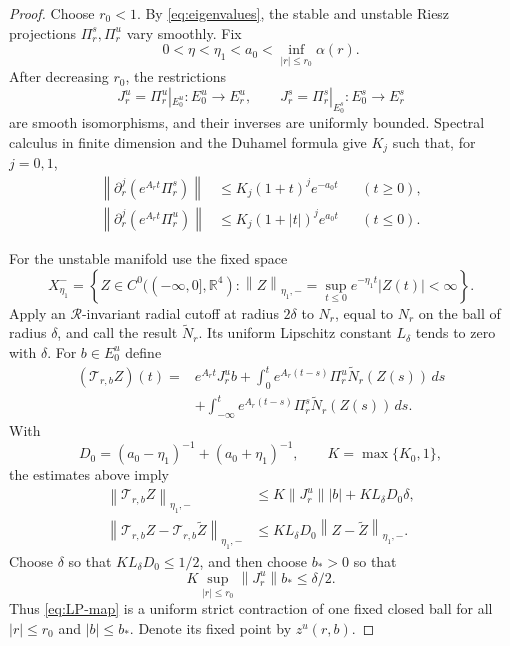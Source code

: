 \documentclass[11pt,reqno]{amsart}
\numberwithin{equation}{section}
\theoremstyle{remark}
\newcommand{\R}{\mathbb R}
\newcommand{\cR}{\mathcal R}
\newcommand{\norm}[1]{\left\lVert #1\right\rVert}
\begin{document}
\begin{proof}
Choose $r_0<1$.  By \eqref{eq:eigenvalues}, the stable and unstable Riesz
projections $\Pi_r^s,\Pi_r^u$ vary smoothly.  Fix
\begin{equation}\label{eq:rates}
 0<\eta<\eta_1<a_0<\inf_{|r|\le r_0}\alpha(r).
\end{equation}
After decreasing $r_0$, the restrictions
\begin{equation}\label{eq:fixed-spaces}
 J_r^u=\Pi_r^u|_{E_0^u}:E_0^u\to E_r^u,
 \qquad
 J_r^s=\Pi_r^s|_{E_0^s}:E_0^s\to E_r^s
\end{equation}
are smooth isomorphisms, and their inverses are uniformly bounded.  Spectral
calculus in finite dimension and the Duhamel formula give $K_j$ such that,
for $j=0,1$,
\begin{equation}\label{eq:semigroup-estimates}
 \begin{aligned}
 \norm{\partial_r^j(e^{A_rt}\Pi_r^s)}
 &\le K_j(1+t)^je^{-a_0t} &&(t\ge0),\\
 \norm{\partial_r^j(e^{A_rt}\Pi_r^u)}
 &\le K_j(1+|t|)^je^{a_0t} &&(t\le0).
 \end{aligned}
\end{equation}

For the unstable manifold use the fixed space
\begin{equation}\label{eq:minus-space}
 X^-_{\eta_1}=\left\{Z\in C^0(({-}\infty,0],\R^4):
 \norm{Z}_{\eta_1,-}=\sup_{t\le0}e^{-\eta_1t}|Z(t)|<\infty\right\}.
\end{equation}
Apply an $\cR$-invariant radial cutoff at radius $2\delta$ to $N_r$, equal
to $N_r$ on the ball of radius $\delta$, and call the result
$\widetilde N_r$.  Its uniform Lipschitz constant $L_\delta$ tends to zero
with $\delta$.  For $b\in E_0^u$ define
\begin{equation}\label{eq:LP-map}
 \begin{aligned}
 (\mathcal T_{r,b}Z)(t)={}&e^{A_rt}J_r^ub
 +\int_0^t e^{A_r(t-s)}\Pi_r^u\widetilde N_r(Z(s))\,ds\\
 &+\int_{-\infty}^t e^{A_r(t-s)}\Pi_r^s
       \widetilde N_r(Z(s))\,ds.
 \end{aligned}
\end{equation}
With
\[
 D_0=(a_0-\eta_1)^{-1}+(a_0+\eta_1)^{-1},
 \qquad K=\max\{K_0,1\},
\]
the estimates above imply
\begin{equation}\label{eq:contraction-estimates}
 \begin{aligned}
 \norm{\mathcal T_{r,b}Z}_{\eta_1,-}
 &\le K\norm{J_r^u}|b|+KL_\delta D_0\delta,\\
 \norm{\mathcal T_{r,b}Z-\mathcal T_{r,b}\widetilde Z}_{\eta_1,-}
 &\le KL_\delta D_0\norm{Z-\widetilde Z}_{\eta_1,-}.
 \end{aligned}
\end{equation}
Choose $\delta$ so that $KL_\delta D_0\le1/2$, and then choose $b_*>0$
so that
\[
 K\sup_{|r|\le r_0}\norm{J_r^u}b_*\le\delta/2.
\]
Thus \eqref{eq:LP-map} is a uniform strict contraction of one fixed closed
ball for all $|r|\le r_0$ and $|b|\le b_*$.  Denote its fixed point by
$z^u(r,b)$.


\end{proof}
\end{document}

